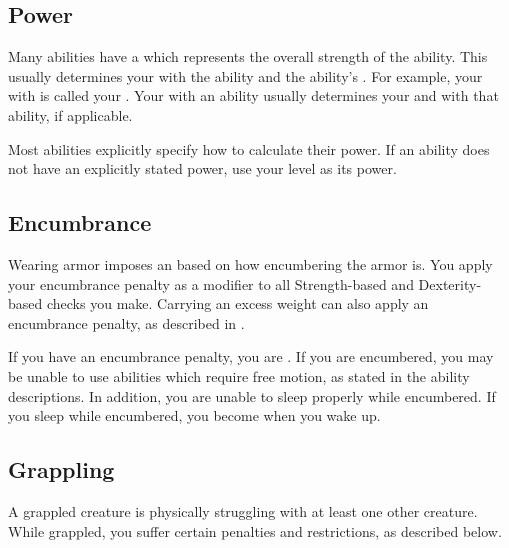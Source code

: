     \subsection{Power}\label{Power}
        Many abilities have a  which represents the overall strength of the ability.
        This usually determines your  with the ability and the ability's .
        For example, your  with  is called your .
        Your  with an ability usually determines your  and  with that ability, if applicable.

        Most abilities explicitly specify how to calculate their power.
        If an ability does not have an explicitly stated power, use your level as its power. 

    \subsection{Encumbrance}\label{Encumbrance}
        Wearing armor imposes an  based on how encumbering the armor is.
        You apply your encumbrance penalty as a modifier to all Strength-based and Dexterity-based checks you make.
        Carrying an excess weight can also apply an encumbrance penalty, as described in .

        If you have an encumbrance penalty, you are .
        If you are encumbered, you may be unable to use abilities which require free motion, as stated in the ability descriptions.
        In addition, you are unable to sleep properly while encumbered.
        If you sleep while encumbered, you become  when you wake up.


    \subsection{Grappling}\label{Grappling}
        A grappled creature is physically struggling with at least one other creature.
        While grappled, you suffer certain penalties and restrictions, as described below.

